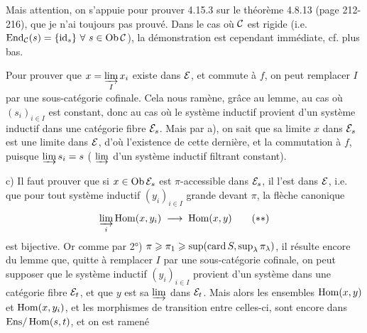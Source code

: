 Mais attention, on s'appuie pour prouver 4.15.3 sur le théorème 4.8.13 (page 212-216), que je n'ai toujours pas prouvé. Dans le cas où $\mathcal{C}$ est rigide (i.e. $\operatorname{End}_{\mathcal{C}}(s) = \{\mathrm{id}_s\}\ \forall\ s \in \operatorname{Ob}\mathcal{C}$), la démonstration est cependant immédiate, cf. plus bas.

Pour prouver que $x = \varinjlim\limits_{I} x_i$ existe dans $\mathcal{E}$, et commute à $f$, on peut remplacer $I$ par une sous-catégorie cofinale. Cela nous ramène, grâce au lemme, au cas où $(s_i)_{i\in I}$ est constant, donc au cas où le système inductif provient d'un système inductif dans une catégorie fibre $\mathcal{E}_s$. Mais par a), on sait que sa limite $x$ dans $\mathcal{E}_s$ est une limite dans $\mathcal{E}$, d'où l'existence de cette dernière, et la commutation à $f$, puisque $\varinjlim s_i = s$ ( $\varinjlim$ d'un système inductif filtrant constant).

c) Il faut prouver que si $x \in \operatorname{Ob}\mathcal{E}_s$ est $\pi$-accessible dans $\mathcal{E}_s$, il l'est dans $\mathcal{E}$, i.e. que pour tout système inductif $(y_i)_{i\in I}$ grande devant $\pi$, la flèche canonique
\[
\varinjlim_{i} \operatorname{Hom}(x,y_i) \;\longrightarrow\; \operatorname{Hom}(x,y) \tag*{$(**)$}
\]
est bijective. Or comme par 2°) $\pi \geqslant \pi_1 \geqslant \sup(\operatorname{card} S, \sup_\lambda \pi_\lambda)$, il résulte encore du lemme %
que, quitte à remplacer $I$ par une sous-catégorie cofinale, on peut supposer que le système inductif $(y_i)_{i\in I}$ provient d'un système dans une catégorie fibre $\mathcal{E}_t$, et que $y$ est sa $\varinjlim$ dans $\mathcal{E}_t$. Mais alors les ensembles $\operatorname{Hom}(x,y)$ et $\operatorname{Hom}(x,y_i)$, et les morphismes de transition entre celles-ci, sont encore dans $\mathrm{Ens}/\operatorname{Hom}(s,t)$, et on est ramené


